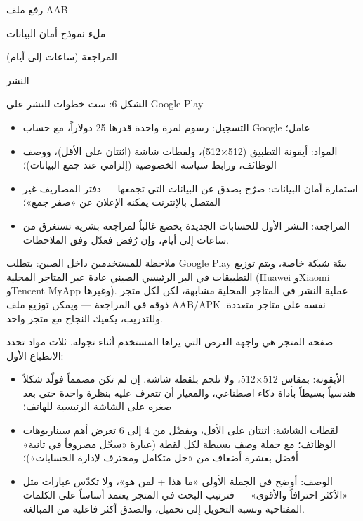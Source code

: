 رفع ملف AAB

ملء نموذج أمان البيانات

المراجعة (ساعات إلى أيام)

النشر

\begin{center}\small\color{gray}الشكل 6: ست خطوات للنشر على Google Play\end{center}

\begin{itemize}
  \item التسجيل: رسوم لمرة واحدة قدرها 25 دولاراً، مع حساب Google عامل؛
  \item المواد: أيقونة التطبيق (512×512)، ولقطات شاشة (اثنتان على الأقل)، ووصف الوظائف، ورابط سياسة الخصوصية (إلزامي عند جمع البيانات)؛
  \item استمارة أمان البيانات: صرّح بصدق عن البيانات التي تجمعها — دفتر المصاريف غير المتصل بالإنترنت يمكنه الإعلان عن «صفر جمع»؛
  \item المراجعة: النشر الأول للحسابات الجديدة يخضع غالباً لمراجعة بشرية تستغرق من ساعات إلى أيام، وإن رُفض فعدّل وفق الملاحظات.
\end{itemize}

ملاحظة للمستخدمين داخل الصين: يتطلب Google Play بيئة شبكة خاصة، ويتم توزيع التطبيقات في البر الرئيسي الصيني عادة عبر المتاجر المحلية (Huawei وXiaomi وTencent MyApp وغيرها). عملية النشر في المتاجر المحلية مشابهة، لكن لكل متجر ذوقه في المراجعة — ويمكن توزيع ملف AAB/APK نفسه على متاجر متعددة. وللتدريب، يكفيك النجاح مع متجر واحد.


صفحة المتجر هي واجهة العرض التي يراها المستخدم أثناء تجوله. ثلاث مواد تحدد الانطباع الأول:

\begin{itemize}
  \item الأيقونة: بمقاس 512×512، ولا تلجم بلقطة شاشة. إن لم تكن مصمماً فولّد شكلاً هندسياً بسيطاً بأداة ذكاء اصطناعي، والمعيار أن تتعرف عليه بنظرة واحدة حتى بعد صغره على الشاشة الرئيسية للهاتف؛
  \item لقطات الشاشة: اثنتان على الأقل، ويفضّل من 4 إلى 6 تعرض أهم سيناريوهات الوظائف؛ مع جملة وصف بسيطة لكل لقطة (عبارة «سجّل مصروفاً في ثانية» أفضل بعشرة أضعاف من «حل متكامل ومحترف لإدارة الحسابات»)؛
  \item الوصف: أوضح في الجملة الأولى «ما هذا + لمن هو»، ولا تكدّس عبارات مثل «الأكثر احترافاً والأقوى» — فترتيب البحث في المتجر يعتمد أساساً على الكلمات المفتاحية ونسبة التحويل إلى تحميل، والصدق أكثر فاعلية من المبالغة.
\end{itemize}

